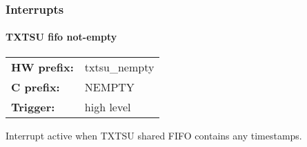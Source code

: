 \subsubsection{Interrupts}
\paragraph*{TXTSU fifo not-empty}\vspace{12pt}
\begin{small}
\begin{tabular}{l l }
{\bf HW prefix:}  & txtsu\_nempty\\
{\bf C prefix:}  & NEMPTY\\
{\bf Trigger:}  & high level\\
\end{tabular}

\end{small}
\vspace{12pt}
Interrupt active when TXTSU shared FIFO contains any timestamps.

